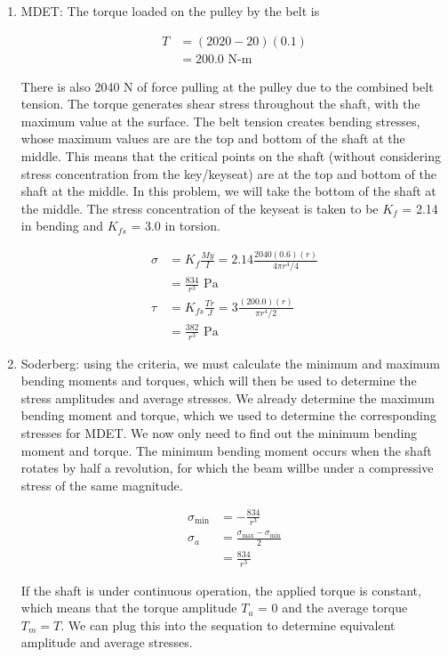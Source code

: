 \documentclass[a4paper,openany]{tufte-book}
\begin{document}
\begin{enumerate}
\item MDET: The torque loaded on the pulley by the belt is

\begin{align*}
T &= (2020-20)(0.1) \\
&= 200.0\text{ N-m}
\end{align*}

There is also 2040 N of force pulling at the pulley due to the combined
belt tension. The torque generates shear stress throughout the shaft,
with the maximum value at the surface. The belt tension creates
bending stresses, whose maximum values are are the top and bottom of
the shaft at the middle. This means that the critical points on the
shaft (without considering stress concentration from the key/keyseat)
are at the top and bottom of the shaft at the middle. In this
problem, we will take the bottom of the shaft at the middle. The
stress concentration of the keyseat is taken to be \(K_{f}\) = 2.14
in bending and \(K_{fs}\) = 3.0 in torsion.

\begin{align*}
\sigma &= K_{f}\frac{My}{I} = 2.14\frac{ 2040(0.6)(r)}{4 \pi r^{4}/4} \\
&= \frac{834}{r^{3}} \text{ Pa} \\
\tau &= K_{fs}\frac{Tr}{J} = 3\frac{(200.0)(r)}{\pi r^{4}/2} \\
&= \frac{382}{r^{3}} \text{ Pa}
\end{align*}

\item Soderberg: using the criteria, we must calculate the minimum and maximum bending moments and torques, which will then be used to determine the stress amplitudes and average stresses. We already determine the maximum bending moment and torque, which we used to determine the corresponding stresses for MDET. We now only need to find out the minimum bending moment and torque. The minimum bending moment occurs when the shaft rotates by half a revolution, for which the beam willbe under a compressive stress of the same magnitude.

\begin{align*}
\sigma_{\min} &= -\frac{834}{r^{3}} \\
\sigma_{a} &= \frac{\sigma_{\max} - \sigma_{\min}}{2} \\
&= \frac{834}{r^{3}}
\end{align*}

If the shaft is under continuous operation, the applied torque is constant, which means that the torque amplitude \(T_{a}\) = 0 and the average torque \(T_{m} = T\). We can plug this into the sequation to determine equivalent amplitude and average stresses.


\end{enumerate}
\end{document}
